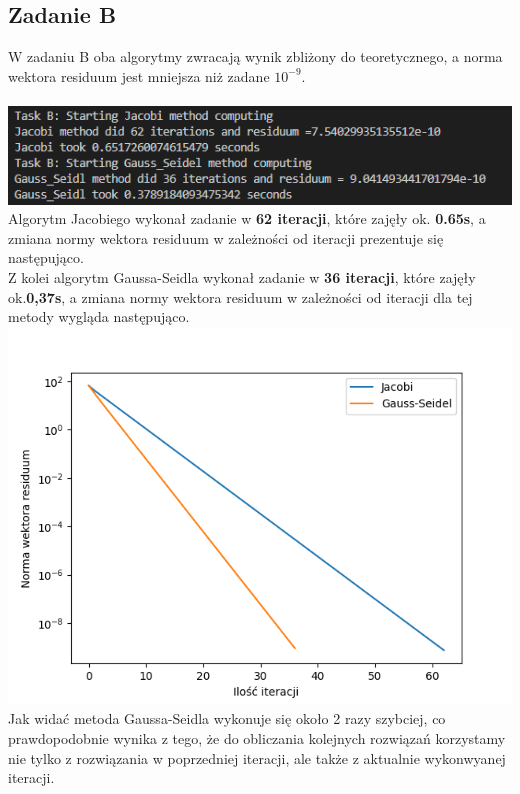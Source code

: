\documentclass[12pt]{article}
\begin{document}
\subsection{Zadanie B}
W zadaniu B oba algorytmy zwracają wynik zbliżony do teoretycznego, a norma wektora residuum jest mniejsza niż zadane $10^{-9}$.\\
\\
\includegraphics{zadanieB_1}\\
Algorytm Jacobiego wykonał zadanie w \textbf{62 iteracji}, które zajęły ok. \textbf{0.65s}, a zmiana normy wektora residuum w zależności od 
iteracji prezentuje się następująco.\\
Z kolei algorytm Gaussa-Seidla wykonał zadanie w \textbf{36 iteracji}, które zajęły ok.\textbf{0,37s}, a zmiana normy wektora residuum w zależności od iteracji dla 
tej metody wygląda następująco.\\
\includegraphics[scale=0.8]{zadanieB_2}\\
Jak widać metoda Gaussa-Seidla wykonuje się około 2 razy szybciej, co prawdopodobnie wynika z tego, że do obliczania kolejnych rozwiązań korzystamy nie tylko z rozwiązania w poprzedniej iteracji, ale także z aktualnie wykonwyanej iteracji.\\
\end{document}
